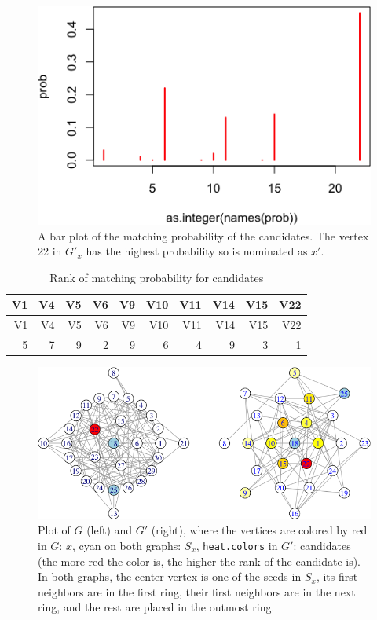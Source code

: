 \documentclass[]{article}
\begin{document}
\begin{figure}
\centering
\includegraphics{vn_files/figure-latex/prob-1.png}
\caption{A bar plot of the matching probability of the candidates. The
vertex 22 in \(G'_x\) has the highest probability so is nominated as
\(x'\).}
\end{figure}

\begin{longtable}[]{@{}rrrrrrrrrr@{}}
\caption{Rank of matching probability for candidates}\tabularnewline
\toprule
V1 & V4 & V5 & V6 & V9 & V10 & V11 & V14 & V15 & V22\tabularnewline
\midrule
\endfirsthead
\toprule
V1 & V4 & V5 & V6 & V9 & V10 & V11 & V14 & V15 & V22\tabularnewline
\midrule
\endhead
5 & 7 & 9 & 2 & 9 & 6 & 4 & 9 & 3 & 1\tabularnewline
\bottomrule
\end{longtable}

\begin{figure}
\centering
\includegraphics{vn_files/figure-latex/plotg3-1.png}
\caption{Plot of \(G\) (left) and \(G'\) (right), where the vertices are
colored by red in \(G\): \(x\), cyan on both graphs: \(S_x\),
\texttt{heat.colors} in \(G'\): candidates (the more red the color is,
the higher the rank of the candidate is). In both graphs, the center
vertex is one of the seeds in \(S_x\), its first neighbors are in the
first ring, their first neighbors are in the next ring, and the rest are
placed in the outmost ring.}
\end{figure}
\end{document}
